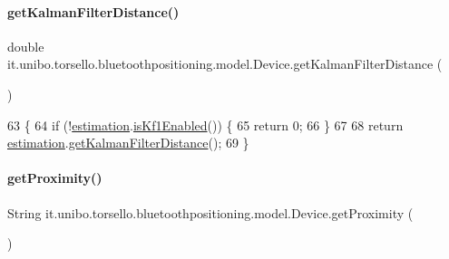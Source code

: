 \paragraph{\texorpdfstring{get\+Kalman\+Filter\+Distance()}{getKalmanFilterDistance()}}
{\footnotesize\ttfamily double it.\+unibo.\+torsello.\+bluetoothpositioning.\+model.\+Device.\+get\+Kalman\+Filter\+Distance (\begin{DoxyParamCaption}{ }\end{DoxyParamCaption})}


\begin{DoxyCode}
63                                             \{
64         \textcolor{keywordflow}{if} (!\hyperlink{classit_1_1unibo_1_1torsello_1_1bluetoothpositioning_1_1model_1_1Device_ac619c42728cd40f41a5f12fde56b4425_ac619c42728cd40f41a5f12fde56b4425}{estimation}.\hyperlink{classit_1_1unibo_1_1torsello_1_1bluetoothpositioning_1_1distanceEstimation_1_1Estimation_a50dcba2a259a12247c634f0285fe6fba_a50dcba2a259a12247c634f0285fe6fba}{isKf1Enabled}()) \{
65             \textcolor{keywordflow}{return} 0;
66         \}
67 
68         \textcolor{keywordflow}{return} \hyperlink{classit_1_1unibo_1_1torsello_1_1bluetoothpositioning_1_1model_1_1Device_ac619c42728cd40f41a5f12fde56b4425_ac619c42728cd40f41a5f12fde56b4425}{estimation}.\hyperlink{classit_1_1unibo_1_1torsello_1_1bluetoothpositioning_1_1distanceEstimation_1_1Estimation_a985e9b8b61c3d1e917a2e818b5f8b679_a985e9b8b61c3d1e917a2e818b5f8b679}{getKalmanFilterDistance}();
69     \}
\end{DoxyCode}
\hypertarget{classit_1_1unibo_1_1torsello_1_1bluetoothpositioning_1_1model_1_1Device_a34510d139c99bc9cfba247ab6ff1b16f_a34510d139c99bc9cfba247ab6ff1b16f}{}\label{classit_1_1unibo_1_1torsello_1_1bluetoothpositioning_1_1model_1_1Device_a34510d139c99bc9cfba247ab6ff1b16f_a34510d139c99bc9cfba247ab6ff1b16f} 
\paragraph{\texorpdfstring{get\+Proximity()}{getProximity()}}
{\footnotesize\ttfamily String it.\+unibo.\+torsello.\+bluetoothpositioning.\+model.\+Device.\+get\+Proximity (\begin{DoxyParamCaption}{ }\end{DoxyParamCaption})}


